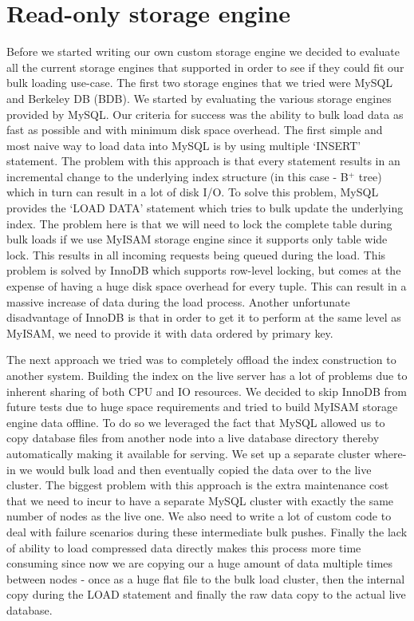 \documentclass[10pt,twocolumn,preprint,nonatbib,numbers]{sigplanconf}
\begin{document}

\section{Read-only storage engine}
\label{sec:read_only}

Before we started writing our own custom storage engine we decided to evaluate all the current storage engines that \projectname{} supported in order to see if they could fit our bulk loading use-case. The first two storage engines that we tried were MySQL and Berkeley DB (BDB). We started by evaluating the various storage engines provided by MySQL. Our criteria for success was the ability to bulk load data as fast as possible and with minimum disk space overhead. The first simple and most naive way to load data into MySQL is by using multiple `INSERT' statement. The problem with this approach is that every statement results in an incremental change to the underlying index structure (in this case - B$^{+}$ tree) which in turn can result in a lot of disk I/O. To solve this problem, MySQL provides the `LOAD DATA' statement which tries to bulk update the underlying index. The problem here is that we will need to lock the complete table during bulk loads if we use MyISAM storage engine since it supports only table wide lock. This results in all incoming requests being queued during the load. This problem is solved by InnoDB which supports row-level locking, but comes at the expense of having a huge disk space overhead for every tuple. This can result in a massive increase of data during the load process. Another unfortunate disadvantage of InnoDB is that in order to get it to perform at the same level as MyISAM, we need to provide it with data ordered by primary key. 

The next approach we tried was to completely offload the index construction to another system. Building the index on the live server has a lot of problems due to inherent sharing of both CPU and IO resources. We decided to skip InnoDB from future tests due to huge space requirements and tried to build MyISAM storage engine data offline. To do so we leveraged the fact that MySQL allowed us to copy database files from another node into a live database directory thereby automatically making it available for serving. We set up a separate cluster where-in we would bulk load and then eventually copied the data over to the live cluster. The biggest problem with this approach is the extra maintenance cost that we need to incur to have a separate MySQL cluster with exactly the same number of nodes as the live one. We also need to write a lot of custom code to deal with failure scenarios during these intermediate bulk pushes. Finally the lack of ability to load compressed data directly makes this process more time consuming since now we are copying our a huge amount of data multiple times between nodes - once as a huge flat file to the bulk load cluster, then the internal copy during the LOAD statement and finally the raw data copy to the actual live database. 
\end{document}
